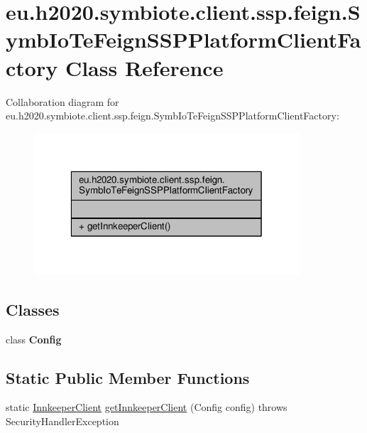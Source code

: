 \hypertarget{classeu_1_1h2020_1_1symbiote_1_1client_1_1ssp_1_1feign_1_1SymbIoTeFeignSSPPlatformClientFactory}{}\section{eu.\+h2020.\+symbiote.\+client.\+ssp.\+feign.\+Symb\+Io\+Te\+Feign\+S\+S\+P\+Platform\+Client\+Factory Class Reference}
\label{classeu_1_1h2020_1_1symbiote_1_1client_1_1ssp_1_1feign_1_1SymbIoTeFeignSSPPlatformClientFactory}


Collaboration diagram for eu.\+h2020.\+symbiote.\+client.\+ssp.\+feign.\+Symb\+Io\+Te\+Feign\+S\+S\+P\+Platform\+Client\+Factory\+:\nopagebreak
\begin{figure}[H]
\begin{center}
\leavevmode
\includegraphics[width=280pt]{classeu_1_1h2020_1_1symbiote_1_1client_1_1ssp_1_1feign_1_1SymbIoTeFeignSSPPlatformClientFactory__coll__graph}
\end{center}
\end{figure}
\subsection*{Classes}
\begin{DoxyCompactItemize}
\item 
class {\bfseries Config}
\end{DoxyCompactItemize}
\subsection*{Static Public Member Functions}
\begin{DoxyCompactItemize}
\item 
static \hyperlink{interfaceeu_1_1h2020_1_1symbiote_1_1client_1_1ssp_1_1interfaces_1_1InnkeeperClient}{Innkeeper\+Client} \hyperlink{classeu_1_1h2020_1_1symbiote_1_1client_1_1ssp_1_1feign_1_1SymbIoTeFeignSSPPlatformClientFactory_acc2dac1fb5b7cc98e0228d6c8ae8d68e}{get\+Innkeeper\+Client} (Config config)  throws Security\+Handler\+Exception 
\end{DoxyCompactItemize}


